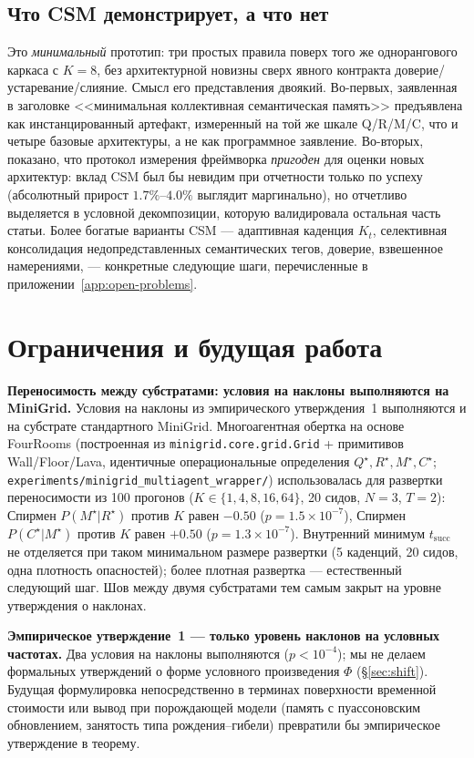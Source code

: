 \documentclass{article}
\begin{document}
\subsection{Что CSM демонстрирует, а что нет}
Это \emph{минимальный} прототип: три простых правила поверх того же однорангового каркаса с $K=8$, без архитектурной новизны сверх явного контракта доверие/устаревание/слияние. Смысл его представления двоякий. Во-первых, заявленная в заголовке <<минимальная коллективная семантическая память>> предъявлена как инстанцированный артефакт, измеренный на той же шкале Q/R/M/C, что и четыре базовые архитектуры, а не как программное заявление. Во-вторых, показано, что протокол измерения фреймворка \emph{пригоден} для оценки новых архитектур: вклад CSM был бы невидим при отчетности только по успеху (абсолютный прирост $1.7\%$--$4.0\%$ выглядит маргинально), но отчетливо выделяется в условной декомпозиции, которую валидировала остальная часть статьи. Более богатые варианты CSM --- адаптивная каденция $K_t$, селективная консолидация недопредставленных семантических тегов, доверие, взвешенное намерениями, --- конкретные следующие шаги, перечисленные в приложении~\ref{app:open-problems}.

\section{Ограничения и будущая работа}
\label{sec:limitations}

\textbf{Переносимость между субстратами: условия на наклоны выполняются на MiniGrid.} Условия на наклоны из эмпирического утверждения~1 выполняются и на субстрате стандартного MiniGrid. Многоагентная обертка на основе FourRooms (построенная из \texttt{minigrid.core.grid.Grid} + примитивов Wall/Floor/Lava, идентичные операциональные определения $Q^\star,R^\star,M^\star,C^\star$; \texttt{experiments/minigrid\_multiagent\_wrapper/}) использовалась для развертки переносимости из 100 прогонов ($K{\in}\{1,4,8,16,64\}$, 20 сидов, $N{=}3$, $T{=}2$): Спирмен $P(M^\star|R^\star)$ против $K$ равен $-0.50$ ($p{=}1.5{\times}10^{-7}$), Спирмен $P(C^\star|M^\star)$ против $K$ равен $+0.50$ ($p{=}1.3{\times}10^{-7}$). Внутренний минимум $t_{\mathrm{succ}}$ не отделяется при таком минимальном размере развертки (5 каденций, 20 сидов, одна плотность опасностей); более плотная развертка --- естественный следующий шаг. Шов между двумя субстратами тем самым закрыт на уровне утверждения о наклонах.

\textbf{Эмпирическое утверждение~1 --- только уровень наклонов на условных частотах.} Два условия на наклоны выполняются ($p<10^{-4}$); мы не делаем формальных утверждений о форме условного произведения $\Phi$ (\S\ref{sec:shift}). Будущая формулировка непосредственно в терминах поверхности временной стоимости или вывод при порождающей модели (память с пуассоновским обновлением, занятость типа рождения--гибели) превратили бы эмпирическое утверждение в теорему.
\end{document}
